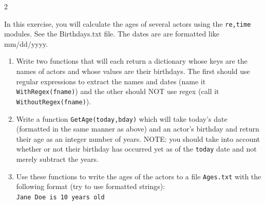 \documentclass[12pt]{article}%
\newcommand{\code}[1]{\texttt{#1}}
\begin{document}
\begin{multicols*}{2}
\begin{Exercise}[origin={20 points, Python}]
\end{Exercise}

\begin{Exercise}[origin={30 points, Python}]

In this exercise, you will calculate the ages of several actors using the \code{re,time} modules. See the Birthdays.txt file. The dates are are formatted like mm/dd/yyyy.
\begin{enumerate}[leftmargin=*]
	\item Write two functions that will each return a dictionary whose keys are the names of actors and whose values are their birthdays. The first should use regular expressions to extract the names and dates (name it \code{WithRegex(fname)}) and the other should NOT use regex (call it \code{WithoutRegex(fname)}).
	\item Write a function \code{GetAge(today,bday)} which will take today's date (formatted in the same manner as above) and an actor's birthday and return their age as an integer number of years. NOTE: you should take into account whether or not their birthday has occurred yet as of the \code{today} date and not merely subtract the years.
	\item Use these functions to write the ages of the actors to a file \code{Ages.txt} with the following format (try to use formatted strings):\\
	\code{Jane Doe is 10 years old}
\end{enumerate}

\end{Exercise}



\vfill\null
\end{multicols*}
\end{document}
